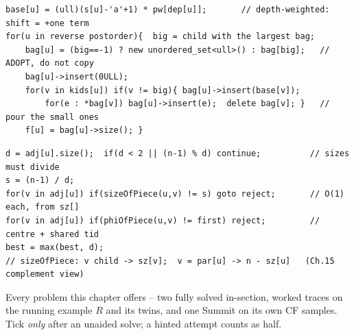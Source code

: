 \begin{lstlisting}[caption={Drill 4 -- distinct downward strings, 601D core (from lst:c22-organic)}]
base[u] = (ull)(s[u]-'a'+1) * pw[dep[u]];       // depth-weighted: shift = +one term
for(u in reverse postorder){  big = child with the largest bag;
    bag[u] = (big==-1) ? new unordered_set<ull>() : bag[big];   // ADOPT, do not copy
    bag[u]->insert(0ULL);
    for(v in kids[u]) if(v != big){ bag[u]->insert(base[v]);
        for(e : *bag[v]) bag[u]->insert(e);  delete bag[v]; }   // pour the small ones
    f[u] = bag[u]->size(); }
\end{lstlisting}

\begin{lstlisting}[caption={Drill 5 -- the Summit's filter and per-piece form (from lst:c22-summit)}]
d = adj[u].size();  if(d < 2 || (n-1) % d) continue;          // sizes must divide
s = (n-1) / d;
for(v in adj[u]) if(sizeOfPiece(u,v) != s) goto reject;       // O(1) each, from sz[]
for(v in adj[u]) if(phiOfPiece(u,v) != first) reject;         // centre + shared tid
best = max(best, d);
// sizeOfPiece: v child -> sz[v];  v = par[u] -> n - sz[u]   (Ch.15 complement view)
\end{lstlisting}


Every problem this chapter offers -- two fully solved in-section, worked traces on the
running example \(R\) and its twins, and one Summit on its own CF samples.  Tick \emph{only}
after an unaided solve; a hinted attempt counts as half.

